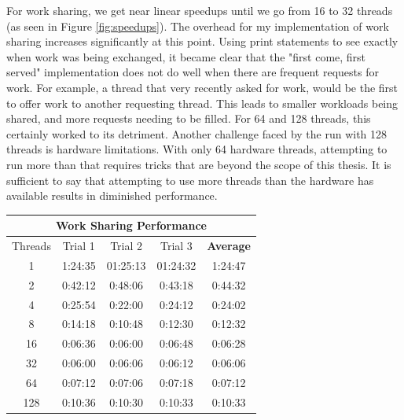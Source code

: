 \documentclass[12pt,twoside]{reedthesis}
\begin{document}
For work sharing, we get near linear speedups until we go from 16 to 32 threads (as seen in Figure \ref{fig:speedups}). The overhead for my implementation of work sharing increases significantly at this point. Using print statements to see exactly when work was being exchanged, it became clear that the "first come, first served" implementation does not do well when there are frequent requests for work. For example, a thread that very recently asked for work, would be the first to offer work to another requesting thread. This leads to smaller workloads being shared, and more requests needing to be filled. For 64 and 128 threads, this certainly worked to its detriment. Another challenge faced by the run with 128 threads is hardware limitations. With only 64 hardware threads, attempting to run more than that requires tricks that are beyond the scope of this thesis. It is sufficient to say that attempting to use more threads than the hardware has available results in diminished performance.
\begin{table}[h!]
\begin{tabular}{ |c | c | c | c | c | }
	 \hline
 	\multicolumn{5}{|c|}{Work Sharing Performance}\\
 	\hline
	 Threads & Trial 1 & Trial 2 & Trial 3 & \textbf{Average}  \\
 	\hline
	1 & 1:24:35 & 01:25:13 & 01:24:32 & 1:24:47 \\
	\hline
	2 & 0:42:12 & 0:48:06 & 0:43:18 & 0:44:32  \\
	\hline
	4 & 0:25:54 & 0:22:00 & 0:24:12 & 0:24:02  \\
	\hline
	8 & 0:14:18 & 0:10:48 & 0:12:30 & 0:12:32  \\
	\hline
	16 & 0:06:36 & 0:06:00 & 0:06:48 & 0:06:28 \\
	\hline
	32 & 0:06:00 & 0:06:06 & 0:06:12 & 0:06:06  \\
	\hline
	64 & 0:07:12 & 0:07:06 & 0:07:18 & 0:07:12  \\
	\hline
	128 & 0:10:36 & 0:10:30 & 0:10:33 & 0:10:33 \\
	 \hline
\end{tabular}
\label{table:ws_perf}
\end{table}
\end{document}
